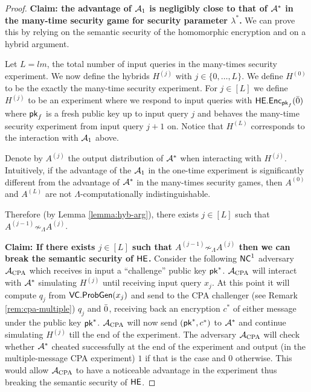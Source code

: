 \begin{proof}
\textbf{Claim: the advantage of $\mathcal{A}_1$ is negligibly close to that of $\mathcal{A}^*$ in the many-time security game for security parameter $\lambda^*$.}
We can  prove this by relying on the semantic security of the homomorphic encryption and on a hybrid argument.

Let $L = lm$, the total number of input queries in the many-times security experiment. We now define the hybrids $H^{(j)}$ with $j \in \{0, \dots, L\}$. We define $H^{(0)}$ to be the exactly the many-time security experiment. 
For $j \in [L]$ we define $H^{(j)}$ to be an experiment where we respond to input queries with $\mathsf{HE.Enc}_{\mathsf{pk}_f}(\bar{0})$  where $\mathsf{pk}_f$ is a fresh public key up to input query $j$ and behaves the many-time security experiment from input query $j+1$ on. Notice that $H^{(L)}$ corresponds to the interaction with $\mathcal{A}_1$ above.

Denote by $A^{(j)}$ the output distribution of $\mathcal{A}^*$ when interacting with $H^{(j)}$.
Intuitively, if the advantage of the $\mathcal{A}_1$ in the one-time experiment is significantly different from the advantage of $\mathcal{A}^*$ in the many-times security games, then $A^{(0)}$ and $A^{(L)}$ are not $\Lambda$-computationally indistinguishable.

Therefore (by Lemma \ref{lemma:hyb-arg}), there exists $j \in [L]$ such that $A^{(j-1)} \not \sim_{\Lambda} A^{(j)}$.

\def\advcpa{\adv_{\text{CPA}}}
\textbf{Claim: If there exists $j \in [L]$ such that $A^{(j-1)} \not \sim_{\Lambda} A^{(j)}$ then we can break the semantic security of $\mathsf{HE}$.
}
Consider the following ${\mathsf{NC}}^1$ adversary $\advcpa$ which receives in input a ``challenge'' public key $\mathsf{pk}^*$. $\advcpa$ will interact with $\mathcal{A}^*$ simulating $H^{(j)}$ until receiving input query $x_{j}$.
At this point it will compute $q_j$ from $\mathsf{VC.ProbGen}(x_j)$ and send to the CPA challenger (see Remark \ref{rem:cpa-multiple}) $q_j$ and $\bar{0}$, receiving back an encryption $c^*$ of either message under the public key $\mathsf{pk}^*$. $\advcpa$ will now send $(\mathsf{pk}^*, c^*)$ to $\mathcal{A}^*$ and continue simulating $H^{(j)}$ till the end of the experiment.
The adversary $\advcpa$ will check whether $\mathcal{A}^*$ cheated successfully at the end of the experiment and output (in the multiple-message CPA experiment) $1$ if that is the case and $0$ otherwise. This would allow $\advcpa$ to have a noticeable advantage in the experiment thus breaking the semantic security of $\mathsf{HE}$. 
\end{proof}

